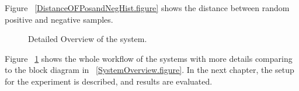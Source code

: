 Figure ~\ref{DistanceOFPosandNegHist.figure} shows the distance between random positive and negative samples.


\begin{figure}[t]
  \caption[Detailed Overview of the system]
  {Detailed Overview of the system.}
  \label{DetailedOverview.figure}
\end{figure}

Figure ~\ref{DetailedOverview.figure} shows the whole workflow of the systems with more details comparing to the block diagram in ~\ref{SystemOverview.figure}.
In the next chapter, the setup for the experiment is described, and results are evaluated.


% 
% 
% 
% 
% 
